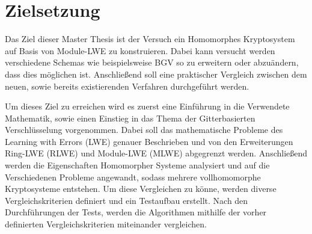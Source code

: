 \chapter{Zielsetzung}
\label{Zielsetzung}

Das Ziel dieser Master Thesis ist der Versuch ein Homomorphes Kryptosystem auf Basis von Module-LWE zu konstruieren. Dabei kann versucht werden verschiedene Schemas wie beispielsweise BGV \cite{BGV} so zu erweitern oder abzuändern, dass dies möglichen ist. Anschließend soll eine praktischer Vergleich zwischen dem neuen, sowie bereits existierenden Verfahren durchgeführt werden.

Um dieses Ziel zu erreichen wird es zuerst eine Einführung in die Verwendete Mathematik, sowie einen Einstieg in das Thema der Gitterbasierten Verschlüsselung vorgenommen. Dabei soll das mathematische Probleme des \glqq Learning with Errors\grqq{} (LWE) genauer Beschrieben und von den Erweiterungen Ring-LWE (RLWE) und Module-LWE (MLWE) abgegrenzt werden. Anschließend werden die Eigenschaften Homomorpher Systeme analysiert und auf die Verschiedenen Probleme angewandt, sodass mehrere vollhomomorphe Kryptosysteme entstehen. Um diese Vergleichen zu könne, werden diverse Vergleichskriterien definiert und ein Testaufbau erstellt. Nach den Durchführungen der Tests, werden die Algorithmen mithilfe der vorher definierten Vergleichskriterien miteinander vergleichen.
